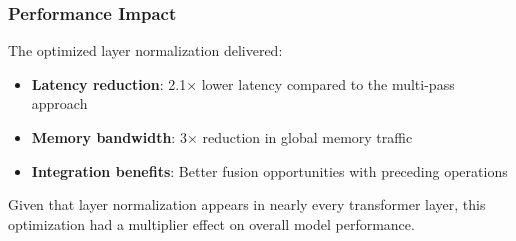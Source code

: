 \subsubsection{Performance Impact}

The optimized layer normalization delivered:
\begin{itemize}
    \item \textbf{Latency reduction}: 2.1× lower latency compared to the multi-pass approach
    \item \textbf{Memory bandwidth}: 3× reduction in global memory traffic
    \item \textbf{Integration benefits}: Better fusion opportunities with preceding operations
\end{itemize}

Given that layer normalization appears in nearly every transformer layer, this optimization had a multiplier effect on overall model performance.

